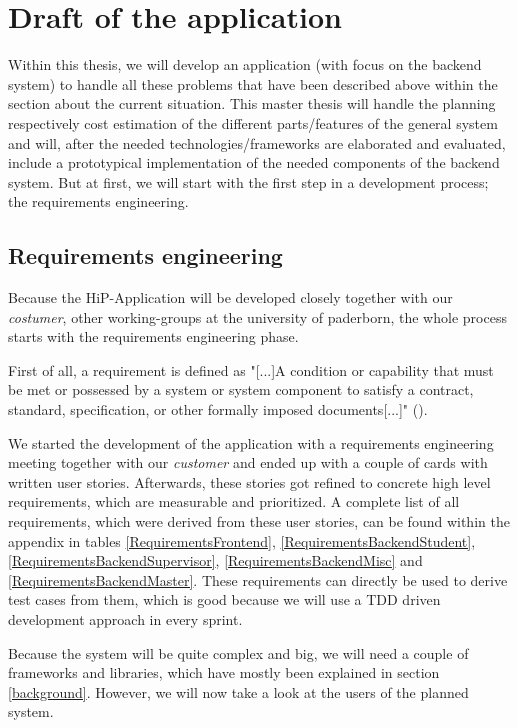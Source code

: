 \chapter[Draft of the application]{Draft of the application}
Within this thesis, we will develop an application (with focus on the backend system) to handle all these problems that have been described above within the section about the current situation. This master thesis will handle the planning respectively cost estimation of the different parts/features of the general system and will, after the needed technologies/frameworks are elaborated and evaluated, include a prototypical implementation of the needed components of the backend system. 
But at first, we will start with the first step in a development process; the requirements engineering.

\section{Requirements engineering}
Because the HiP-Application will be developed closely together with our \textit{costumer}, other working-groups at the university of paderborn, the whole process starts with the requirements engineering phase.

First of all, a requirement is defined as "[...]A condition or capability that must be met or possessed by a system or system component to satisfy a contract, standard, specification, or other formally imposed documents[...]" (\cite{IEEEReq}).

We started the development of the application with a requirements engineering meeting together with our \textit{customer} and ended up with a couple of cards with written user stories. Afterwards, these stories got refined to concrete high level requirements, which are measurable and prioritized. A complete list of all requirements, which were derived from these user stories, can be found within the appendix in tables \ref{RequirementsFrontend}, \ref{RequirementsBackendStudent}, \ref{RequirementsBackendSupervisor}, \ref{RequirementsBackendMisc} and \ref{RequirementsBackendMaster}. These requirements can directly be used to derive test cases from them, which is good because we will use a \ac{TDD} driven development approach in every sprint. 

Because the system will be quite complex and big, we will need a couple of frameworks and libraries, which have mostly been explained in section \ref{background}. However, we will now take a look at the users of the planned system.

